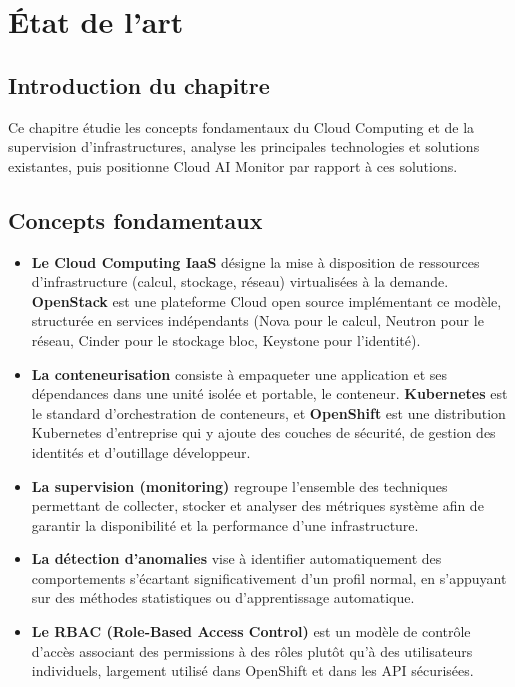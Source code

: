 \documentclass[11pt,a4paper]{report}
\begin{document}
\newpage
\chapter{État de l'art}

\section*{Introduction du chapitre}

Ce chapitre étudie les concepts fondamentaux du Cloud Computing et de la
supervision d'infrastructures, analyse les principales technologies et
solutions existantes, puis positionne Cloud AI Monitor par rapport à ces
solutions.

\section{Concepts fondamentaux}

\begin{itemize}[label=\textbullet, leftmargin=1.5cm, labelsep=0.5cm,
                itemsep=0.25em, parsep=0em, topsep=0.2em]
    \item \textbf{Le Cloud Computing IaaS} désigne la mise à disposition de
    ressources d'infrastructure (calcul, stockage, réseau) virtualisées à la
    demande. \textbf{OpenStack} est une plateforme Cloud open source
    implémentant ce modèle, structurée en services indépendants (Nova pour le
    calcul, Neutron pour le réseau, Cinder pour le stockage bloc, Keystone
    pour l'identité).
    \item \textbf{La conteneurisation} consiste à empaqueter une application
    et ses dépendances dans une unité isolée et portable, le conteneur.
    \textbf{Kubernetes} est le standard d'orchestration de conteneurs, et
    \textbf{OpenShift} est une distribution Kubernetes d'entreprise qui y
    ajoute des couches de sécurité, de gestion des identités et d'outillage
    développeur.
    \item \textbf{La supervision (monitoring)} regroupe l'ensemble des
    techniques permettant de collecter, stocker et analyser des métriques
    système afin de garantir la disponibilité et la performance d'une
    infrastructure.
    \item \textbf{La détection d'anomalies} vise à identifier automatiquement
    des comportements s'écartant significativement d'un profil normal, en
    s'appuyant sur des méthodes statistiques ou d'apprentissage automatique.
    \item \textbf{Le RBAC (Role-Based Access Control)} est un modèle de
    contrôle d'accès associant des permissions à des rôles plutôt qu'à des
    utilisateurs individuels, largement utilisé dans OpenShift et dans les
    API sécurisées.
\end{itemize}
\end{document}
